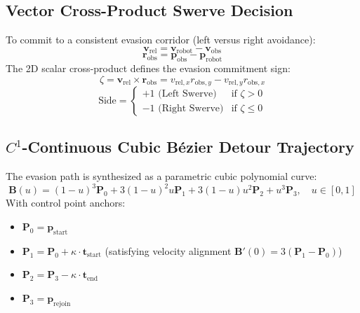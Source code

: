 \documentclass[10pt,a4paper]{article}
\begin{document}
\subsection{Vector Cross-Product Swerve Decision}
To commit to a consistent evasion corridor (left versus right avoidance):
\begin{equation}
\mathbf{v}_{\text{rel}} = \mathbf{v}_{\text{robot}} - \mathbf{v}_{\text{obs}}
\end{equation}
\begin{equation}
\mathbf{r}_{\text{obs}} = \mathbf{p}_{\text{obs}} - \mathbf{p}_{\text{robot}}
\end{equation}
The 2D scalar cross-product defines the evasion commitment sign:
\begin{equation}
\zeta = \mathbf{v}_{\text{rel}} \times \mathbf{r}_{\text{obs}} = v_{\text{rel}, x} r_{\text{obs}, y} - v_{\text{rel}, y} r_{\text{obs}, x}
\end{equation}
\begin{equation}
\text{Side} = \begin{cases} +1 \text{ (Left Swerve)} & \text{if } \zeta > 0 \\ -1 \text{ (Right Swerve)} & \text{if } \zeta \le 0 \end{cases}
\end{equation}

\subsection{$C^1$-Continuous Cubic B\'ezier Detour Trajectory}
The evasion path is synthesized as a parametric cubic polynomial curve:
\begin{equation}
\mathbf{B}(u) = (1-u)^3 \mathbf{P}_0 + 3(1-u)^2 u \mathbf{P}_1 + 3(1-u) u^2 \mathbf{P}_2 + u^3 \mathbf{P}_3, \quad u \in [0, 1]
\end{equation}
With control point anchors:
\begin{itemize}
    \item $\mathbf{P}_0 = \mathbf{p}_{\text{start}}$
    \item $\mathbf{P}_1 = \mathbf{P}_0 + \kappa \cdot \mathbf{t}_{\text{start}}$ (satisfying velocity alignment $\mathbf{B}'(0) = 3(\mathbf{P}_1 - \mathbf{P}_0)$)
    \item $\mathbf{P}_2 = \mathbf{P}_3 - \kappa \cdot \mathbf{t}_{\text{end}}$
    \item $\mathbf{P}_3 = \mathbf{p}_{\text{rejoin}}$
\end{itemize}
\end{document}
